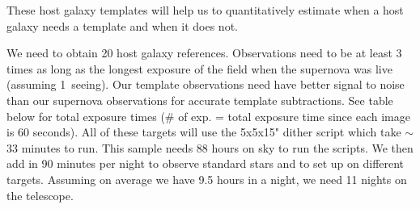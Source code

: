 \documentclass[11pt]{article}
\begin{document}

%



%

\technicaldescription

These host galaxy templates will help us to quantitatively estimate when a host galaxy needs a template and when it does not.

We need to obtain 20 host galaxy references. 
Observations need to be at least 3 times as long as the longest exposure of the field when the supernova was live (assuming 1\arcsec\ seeing).
Our template observations need have better signal to noise than our supernova observations for accurate template subtractions. 
See table below for total exposure times ($\#$ of exp. = total exposure time since each image is 60 seconds).
All of these targets will use the 5x5x15" dither script which take $\sim$ 33 minutes to run.
This sample needs 88 hours on sky to run the scripts. 
We then add in 90 minutes per night to observe standard stars and to set up on different targets. 
Assuming on average we have 9.5 hours in a night, we need 11 nights on the telescope.  
\end{document}
